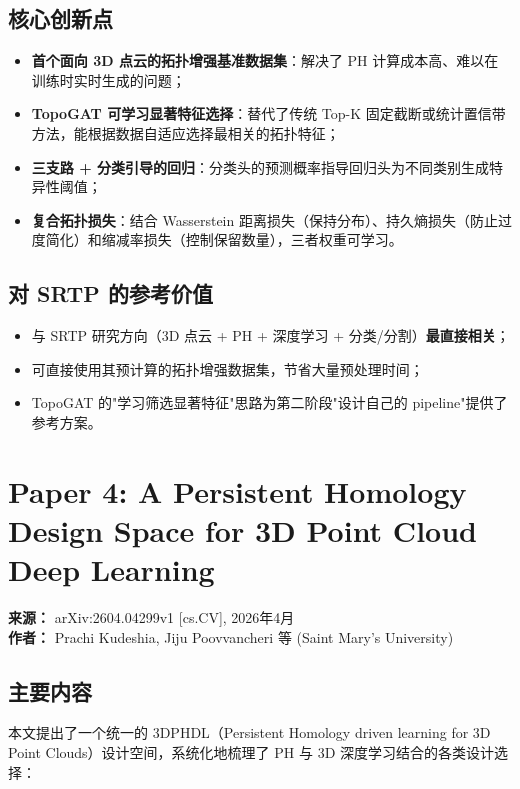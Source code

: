 \documentclass[11pt,a4paper]{article}
\begin{document}
\subsection*{核心创新点}
\begin{itemize}[nosep]
  \item \textbf{首个面向 3D 点云的拓扑增强基准数据集}：解决了 PH 计算成本高、难以在训练时实时生成的问题；
  \item \textbf{TopoGAT 可学习显著特征选择}：替代了传统 Top-K 固定截断或统计置信带方法，能根据数据自适应选择最相关的拓扑特征；
  \item \textbf{三支路 + 分类引导的回归}：分类头的预测概率指导回归头为不同类别生成特异性阈值；
  \item \textbf{复合拓扑损失}：结合 Wasserstein 距离损失（保持分布）、持久熵损失（防止过度简化）和缩减率损失（控制保留数量），三者权重可学习。
\end{itemize}

\subsection*{对 SRTP 的参考价值}
\begin{itemize}[nosep]
  \item 与 SRTP 研究方向（3D 点云 + PH + 深度学习 + 分类/分割）\textbf{最直接相关}；
  \item 可直接使用其预计算的拓扑增强数据集，节省大量预处理时间；
  \item TopoGAT 的"学习筛选显著特征"思路为第二阶段"设计自己的 pipeline"提供了参考方案。
\end{itemize}


\section{Paper 4: A Persistent Homology Design Space for 3D Point Cloud Deep Learning}

\textbf{来源：} arXiv:2604.04299v1 [cs.CV], 2026年4月 \\
\textbf{作者：} Prachi Kudeshia, Jiju Poovvancheri 等 (Saint Mary's University)

\subsection*{主要内容}
本文提出了一个统一的 3DPHDL（Persistent Homology driven learning for 3D Point Clouds）设计空间，系统化地梳理了 PH 与 3D 深度学习结合的各类设计选择：
\end{document}

